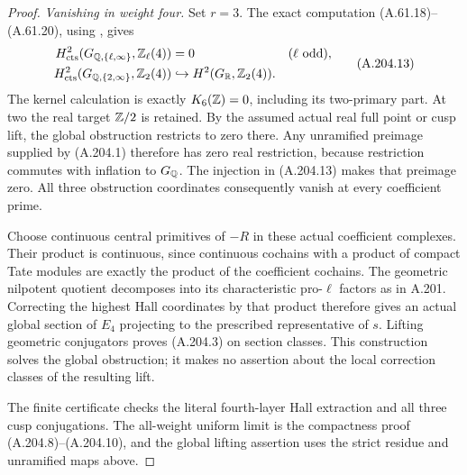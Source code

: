 \begin{proof}
\emph{Vanishing in weight four.}
Set \(r=3\).  The exact computation
(A.61.18)--(A.61.20), using
\cite[VI, Theorems 8.2, 9.11 (case \(n=6\)),
and Examples 10.3]{Weibel2013}, gives
\[
\begin{aligned}
 H^2_{\rm cts}(G_{\mathbb Q,\{\ell,\infty\}},\mathbb Z_\ell(4))&=0
                                      &&(\ell\text{ odd}),\\
 H^2_{\rm cts}(G_{\mathbb Q,\{2,\infty\}},\mathbb Z_2(4))
       &\hookrightarrow H^2(G_\mathbb R,\mathbb Z_2(4)).
\end{aligned}
\tag{A.204.13}
\]
The kernel calculation is exactly \(K_6(\mathbb Z)=0\),
including its two-primary part.  At two the real target
\(\mathbb Z/2\) is retained.  By the assumed actual real full
point or cusp lift, the global obstruction restricts
to zero there.  Any unramified preimage supplied by
(A.204.1) therefore has zero real restriction, because
restriction commutes with inflation to \(G_\mathbb Q\).
The injection in (A.204.13) makes that preimage zero.
All three obstruction coordinates consequently vanish
at every coefficient prime.

Choose continuous central primitives of \(-R\) in these
actual coefficient complexes.  Their product is continuous,
since continuous cochains with a product of compact Tate
modules are exactly the product of the coefficient cochains.
The geometric nilpotent quotient decomposes into its
characteristic pro-\(\ell\) factors as in A.201.
Correcting the highest Hall coordinates by that product
therefore gives an actual global section of \(E_4\)
projecting to the prescribed representative of \(s\).
Lifting geometric conjugators proves (A.204.3) on section
classes.  This construction solves the global obstruction;
it makes no assertion about the local correction classes
of the resulting lift.

The finite certificate
checks the literal fourth-layer Hall extraction and all
three cusp conjugations.  The all-weight uniform limit
is the compactness proof (A.204.8)--(A.204.10), and the
global lifting assertion uses the strict residue and
unramified maps above.
\end{proof}
